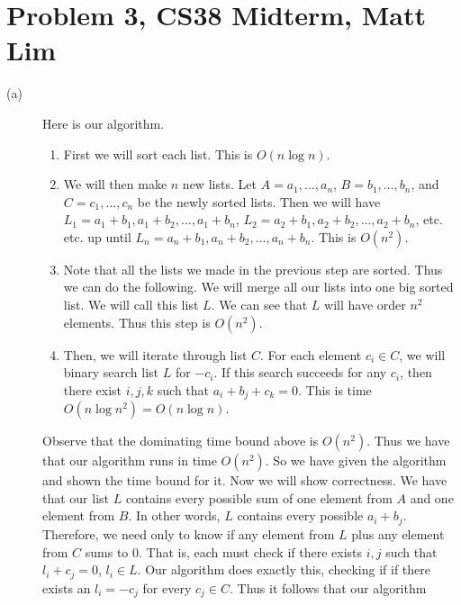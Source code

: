 \documentclass{article}
\begin{document}
\section*{Problem 3, CS38 Midterm, Matt Lim}
\begin{description}
    \item[(a)]
        Here is our algorithm.
        \begin{enumerate}
            \item First we will sort each list. This is $O(n\log n)$.
            \item We will then make $n$ new lists. Let $A = a_1, \dots, a_n$,
                $B = b_1, \dots, b_n$, and $C = c_1, \dots, c_n$ be the newly sorted
                lists. Then we will have $L_1 = a_1 + b_1, a_1 + b_2, \dots, a_1
                + b_n$, $L_2 = a_2 + b_1, a_2 + b_2, \dots, a_2 + b_n$, etc.
                etc. up until $L_n = a_n + b_1, a_n + b_2, \dots, a_n + b_n$.
                This is $O(n^2)$.
            \item Note that all the lists we made in the previous step are
                sorted. Thus we can do the following.
                We will merge all our lists into one big sorted list. We
                will call this list $L$. We can see that $L$ will have order
                $n^2$ elements. Thus this step is $O(n^2)$.
            \item Then, we will iterate through list $C$. For each element $c_i
                \in C$, we will binary search list $L$ for $-c_i$. If this
                search succeeds for any $c_i$, then there exist $i,j,k$ such that
                $a_i + b_j + c_k = 0$. This is time $O(n\log n^2) =
                O(n\log n)$.
        \end{enumerate}
        Observe that the dominating time bound above is $O(n^2)$. Thus we have
        that our algorithm runs in time $O(n^2)$.
        So we have given the algorithm and shown the time bound for it. Now we
        will show correctness. We have that our list $L$ contains every possible
        sum of one element from $A$ and one element from $B$. In other words,
        $L$ contains every possible $a_i + b_j$. Therefore, we need only to know
        if any element from $L$ plus any element from $C$ sums to $0$. That is,
        each must check if there exists $i,j$ such that $l_i + c_j = 0$, $l_i
        \in L$. Our algorithm does exactly this, checking if if there exists an
        $l_i = -c_j$ for every $c_j \in C$. Thus it follows that our algorithm

\end{description}
\end{document}
